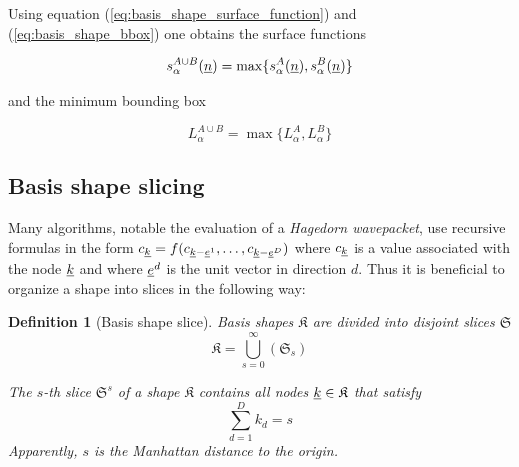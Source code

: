 \documentclass{article}
\newtheorem{definition}{Definition}
\begin{document}
Using equation (\ref{eq:basis_shape_surface_function}) and (\ref{eq:basis_shape_bbox})
one obtains the surface functions

\begin{equation}
  s_{\alpha}^{A \cup B}(\underline{n}) = \max\{s_{\alpha}^A(\underline{n}), s_{\alpha}^B(\underline{n})\}
\end{equation}

and the minimum bounding box

\begin{equation}
  L_{\alpha}^{A \cup B} = \max\{L_{\alpha}^{A}, L_{\alpha}^{B}\}
\end{equation}

\subsection{Basis shape slicing} \label{sec:basis_shape_slice}
Many algorithms, notable the evaluation of a \emph{Hagedorn wavepacket},
use recursive formulas in the form
\( c_{\underline{k}} = f(c_{\underline{k}-\underline{e}^1}, \ldots,
c_{\underline{k}-\underline{e}^D}) \)
where \( c_{\underline{k}} \)
is a value associated with the node \( \underline{k} \)
and where \( \underline{e}^d \)
is the unit vector in direction \( d \).
Thus it is beneficial to organize a shape into slices in the following way:

\begin{definition}[Basis shape slice]
  \label{eq:basis_shape_slice}
  Basis shapes \(\mathfrak{K}\) are divided into disjoint slices \(\mathfrak{S}\)
  \begin{equation}
    \mathfrak{K}=\bigcup_{s=0}^{\infty} \left(\mathfrak{S}_s\right)
  \end{equation}
  
  The \( s \)-th
  slice \( \mathfrak{S}^s \) of a shape \( \mathfrak{K} \)
  contains all nodes \( \underline{k} \in \mathfrak{K} \)
  that satisfy
  \begin{equation}
    \sum_{d=1}^{D} k_d = s
  \end{equation}
  Apparently, \(s\) is the Manhattan distance to the origin.
\end{definition}
\end{document}
